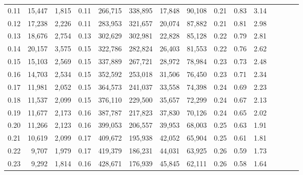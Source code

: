 \begin{tabular}{rrrcrrrrrrrrrrr}
0.11 &  15,447 &   1,815 &                                       0.11 &  266,715 &  338,895 &   17,848 &   90,108 &  0.21 &  0.83 &                         3.14 \\
0.12 &  17,238 &   2,226 &                                       0.11 &  283,953 &  321,657 &   20,074 &   87,882 &  0.21 &  0.81 &                         2.98 \\
0.13 &  18,676 &   2,754 &                                       0.13 &  302,629 &  302,981 &   22,828 &   85,128 &  0.22 &  0.79 &                         2.81 \\
0.14 &  20,157 &   3,575 &                                       0.15 &  322,786 &  282,824 &   26,403 &   81,553 &  0.22 &  0.76 &                         2.62 \\
0.15 &  15,103 &   2,569 &                                       0.15 &  337,889 &  267,721 &   28,972 &   78,984 &  0.23 &  0.73 &                         2.48 \\
0.16 &  14,703 &   2,534 &                                       0.15 &  352,592 &  253,018 &   31,506 &   76,450 &  0.23 &  0.71 &                         2.34 \\
0.17 &  11,981 &   2,052 &                                       0.15 &  364,573 &  241,037 &   33,558 &   74,398 &  0.24 &  0.69 &                         2.23 \\
0.18 &  11,537 &   2,099 &                                       0.15 &  376,110 &  229,500 &   35,657 &   72,299 &  0.24 &  0.67 &                         2.13 \\
0.19 &  11,677 &   2,173 &                                       0.16 &  387,787 &  217,823 &   37,830 &   70,126 &  0.24 &  0.65 &                         2.02 \\
0.20 &  11,266 &   2,123 &                                       0.16 &  399,053 &  206,557 &   39,953 &   68,003 &  0.25 &  0.63 &                         1.91 \\
0.21 &  10,619 &   2,099 &                                       0.17 &  409,672 &  195,938 &   42,052 &   65,904 &  0.25 &  0.61 &                         1.81 \\
0.22 &   9,707 &   1,979 &                                       0.17 &  419,379 &  186,231 &   44,031 &   63,925 &  0.26 &  0.59 &                         1.73 \\
0.23 &   9,292 &   1,814 &                                       0.16 &  428,671 &  176,939 &   45,845 &   62,111 &  0.26 &  0.58 &                         1.64 \\

\end{tabular}
